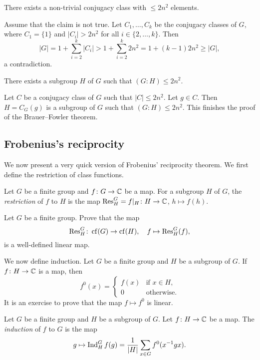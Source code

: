 \begin{claim}
    There exists a non-trivial conjugacy class with $\leq 2n^2$ elements.
\end{claim}

Assume that the claim is not true. Let
$C_1,\dots,C_k$ be the conjugacy classes of $G$, where 
$C_1=\{1\}$ and $|C_i|>2n^2$ for all $i\in\{2,\dots,k\}$. Then
\[
|G|=1+\sum_{i=2}^k|C_i|>1+\sum_{i=2}^k2n^2=1+(k-1)2n^2\geq |G|,
\]
a contradiction. 

\begin{claim}
    There exists a subgroup $H$ of $G$ such that
    $(G:H)\leq 2n^2$.
\end{claim}

Let $C$ be a conjugacy class of $G$ such that 
$|C|\leq 2n^2$. Let $g\in C$.  
Then $H=C_G(g)$ is a subgroup of $G$ such that
$(G:H)\leq 2n^2$. 
This finishes the proof of the Brauer--Fowler theorem. 



\subsection{Frobenius's reciprocity}

We now present a very quick version of Frobenius'
reciprocity theorem. We first 
define the restriction of class functions. 

\begin{definition}
    Let $G$ be a finite group and $f\colon G\to\mathbb{C}$ be
    a map. For a subgroup $H$ of $G$, the \emph{restriction}
    of $f$ to $H$ is the map 
    $\operatorname{Res}_H^G=f|_H\colon H\to\mathbb{C}$, $h\mapsto f(h)$. 
\end{definition}

\begin{exercise}
\label{xca:restriction}
    Let $G$ be a finite group. Prove that
    the map 
    \[
    \operatorname{Res}_H^G\colon\operatorname{cf}(G)\to\operatorname{cf}(H),\quad  f\mapsto\operatorname{Res}_H^G(f),
    \]
    is a well-defined linear map. 
\end{exercise}

We now define induction. Let $G$ be a finite group
and $H$ be a subgroup of $G$. If $f\colon H\to\mathbb{C}$ is a map, 
then 
\[
f^0(x)=\begin{cases}
    f(x) & \text{if $x\in H$},\\
    0 & \text{otherwise}.
    \end{cases}
\]
It is an exercise to prove that
the map $f\mapsto f^0$ is linear. 

\begin{definition}
    Let $G$ be a finite group and $H$ be a subgroup of $G$. Let
    $f\colon H\to\mathbb{C}$ be
    a map. The \emph{induction}
    of $f$ to $G$ is the map 
    \begin{align*}
      g\mapsto\operatorname{Ind}_H^Gf(g)=\frac{1}{|H|}\sum_{x\in G}f^0(x^{-1}gx).
    \end{align*}
\end{definition}

